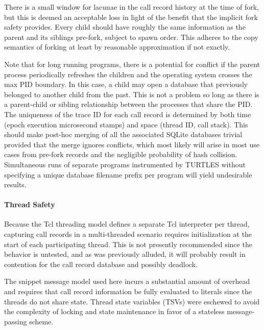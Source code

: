 \documentclass{article}[letter,10pt]
\begin{document}
{{{{        There is a small window for lacunae in the call record history at the time of fork, but this is deemed
        an acceptable loss in light of the benefit that the implicit fork safety provides. Every child should have
        roughly the same information as the parent and its siblings pre-fork, subject to spawn order. This adheres
        to the copy semantics of forking at least by reasonable approximation if not exactly.

        Note that for long running programs, there is a potential for conflict if the parent process periodically
        refreshes the children and the operating system crosses the max PID boundary. In this case, a child may open
        a database that previously belonged to another child from the past. This is not a problem so long as there
        is a parent-child or sibling relationship between the processes that share the PID. The uniqueness of the
        trace ID for each call record is determined by both time (epoch execution microsecond stamps) and space
        (thread ID, call stack). This should make post-hoc merging of all the associated SQLite databases trivial
        provided that the merge ignores conflicts, which most likely will arise in most use cases from pre-fork records and the
        negligible probability of hash collision. Simultaneous runs of separate
        programs instrumented by TURTLES without specifying a unique database filename prefix per program
        will yield undesirable results.
      }
      \paragraph{Thread Safety}{
        Because the Tcl threading model defines a separate Tcl interpreter per thread, capturing call records
        in a multi-threaded scenario requires initialization at the start of each participating thread.
        This is not presently recommended since the behavior is untested, and as was previously alluded, it will
        probably result in contention for the call record database and possibly deadlock.

        The snippet message model used here incurs a substantial amount of overhead and requires that call record information
        be fully evaluated to literals since the threads do not share state. Thread state variables (TSVs) were
        eschewed to avoid the complexity of locking and state maintenance in favor of a stateless message-passing scheme.
      }
    }
  }

}
\end{document}
